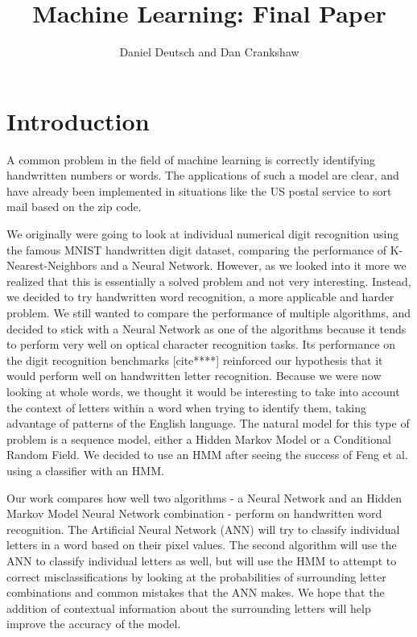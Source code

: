 \documentclass[11pt,a4paper,twocolumn]{article}
\author{Daniel Deutsch and Dan Crankshaw}
\title{Machine Learning: Final Paper}
\date{}
\begin{document}
\maketitle

\section{Introduction}

A common problem in the field of machine learning is correctly identifying
handwritten numbers or words. The applications of
such a model are clear, and have already been implemented in situations like
the US postal service to sort mail based on the zip code.

We originally were going to look at individual numerical digit recognition using the famous
MNIST handwritten digit dataset, comparing the performance of K-Nearest-Neighbors and a
Neural Network. However, as we looked into it more we realized that this is essentially a solved
problem and not very interesting. Instead, we decided to try handwritten word recognition,
a more applicable and harder problem. We still wanted to compare the performance of multiple
algorithms, and decided to stick with a Neural Network as one of the algorithms because it tends to
perform very well on optical character recognition tasks. Its performance on the digit recognition
benchmarks [cite****] reinforced our hypothesis that it would perform well on handwritten letter
recognition. Because we were now looking at whole words, we thought it would be interesting to take
into account the context of letters within a word when trying to identify them, taking advantage of
patterns of the English language. The natural model for this type of problem is a sequence model,
either a Hidden Markov Model or a Conditional Random Field. We decided to use an HMM after seeing
the success of Feng et al.\cite{feng2008hidden} using a classifier with an HMM.

Our work compares how well two algorithms - a Neural Network and an Hidden Markov Model Neural
Network combination - perform on handwritten word recognition. The Artificial Neural Network (ANN) will
try to classify individual letters in a word based on their pixel values. The second algorithm will
use the ANN to classify individual letters as well, but will use the HMM to attempt to correct
misclassifications by looking at the probabilities of surrounding letter combinations and common
mistakes that the ANN makes. We hope that the addition of contextual information
about the surrounding letters will help improve the accuracy of the model.
\end{document}
